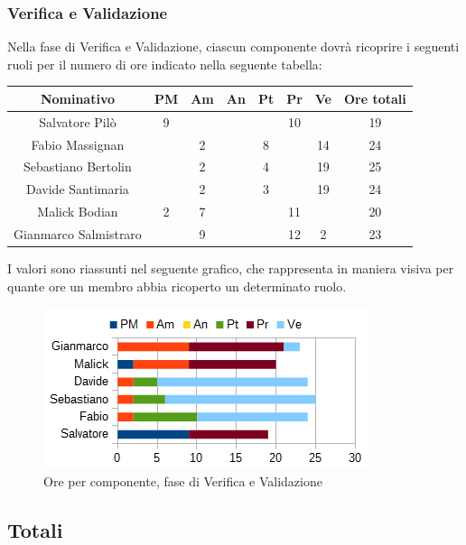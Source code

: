 		\subsubsection{Verifica e Validazione}
		Nella fase di Verifica e Validazione, ciascun componente dovrà ricoprire i seguenti ruoli per il numero di ore indicato nella seguente tabella: \\
		\begin{table}[H]
		\centering
		\begin{tabular}{|c|c|c|c|c|c|c|c|}
			\hline
			\textbf{Nominativo}		& \textbf{PM}	& \textbf{Am}	& \textbf{An}	& \textbf{Pt}	& \textbf{Pr}	& \textbf{Ve}	& \textbf{Ore totali}     \\
			\hline
			Salvatore Pilò			& 9		& 		& 		&		& 10	&		& 19 \\
			Fabio Massignan			&		& 2		&		& 8		&		& 14	& 24 \\
			Sebastiano Bertolin		&		& 2		& 		& 4		&		& 19	& 25 \\
			Davide Santimaria		&		& 2		& 		& 3		&		& 19	& 24 \\
			Malick Bodian			& 2		& 7		&		&		& 11	& 		& 20 \\
			Gianmarco Salmistraro	&		& 9		& 		&		& 12	& 2		& 23 \\
			\hline
		\end{tabular}
		\end{table}
		I valori sono riassunti nel seguente grafico, che rappresenta in maniera visiva per quante ore un membro abbia ricoperto un determinato ruolo. \\
		\begin{figure}[H]
			\centering
			\includegraphics[scale=1]{immagini/grafici/validazione-barra.png}
			\caption{Ore per componente, fase di Verifica e Validazione}
		\end{figure}
	\subsection{Totali}
